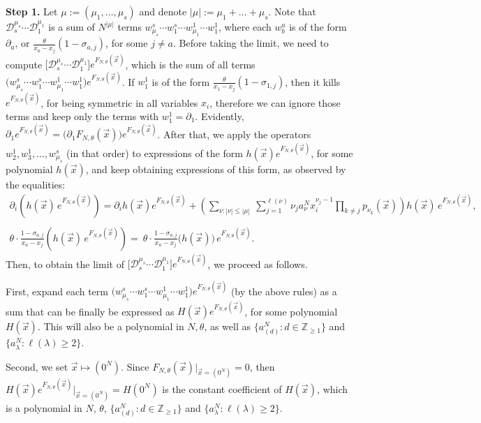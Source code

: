 \documentclass[11pt]{article}
\theoremstyle{plain}
\newcommand{\D}{\mathcal D}
\newcommand{\Z}{\mathbb Z}
\newcommand{\la}{\lambda}
\newcommand{\vecx}{\vec{x}}
\begin{document}
\medskip

\textbf{Step 1.} Let $\mu:=(\mu_1,\dots,\mu_s)$ and denote $|\mu|:=\mu_1+\dots+\mu_s$.
Note that $\D_s^{\mu_s}\cdots\D_1^{\mu_1}$ is a sum of $N^{|\mu|}$ terms $w^s_{\mu_s}\cdots w^s_1\cdots w^1_{\mu_1}\cdots w^1_1$, where each $w^a_b$ is of the form $\partial_a$, or $\frac{\theta}{x_a-x_j}(1-\sigma_{a,j})$, for some $j\ne a$.
Before taking the limit, we need to compute $\Big[ \D_s^{\mu_s}\cdots\D_1^{\mu_1} \Big] e^{ F_{N,\theta}(\vecx) }$, which is the sum of all terms $\big(w^s_{\mu_s}\cdots w^s_1\cdots w^1_{\mu_1}\cdots w^1_1\big)e^{F_{N,\theta}(\vecx)}$.
If $w^1_1$ is of the form $\frac{\theta}{x_1-x_j}(1-\sigma_{1,j})$, then it kills $e^{ F_{N,\theta}(\vecx) }$, for being symmetric in all variables $x_i$, therefore we can ignore those terms and keep only the terms with $w^1_1=\partial_1$.
Evidently, $\partial_1e^{ F_{N,\theta}(\vecx) } = \big( \partial_1 F_{N,\theta}(\vecx) \big) e^{ F_{N,\theta}(\vecx) }$.
After that, we apply the operators $w^1_2,w^1_3,\dots,w^s_{\mu_s}$ (in that order) to expressions of the form $h(\vecx)e^{F_{N,\theta}(\vecx)}$, for some polynomial $h(\vecx)$, and keep obtaining expressions of this form, as observed by the equalities:
\begin{gather}
\partial_i\left( h(\vecx)\, e^{F_{N,\theta}(\vecx)} \right) = \partial_i h(\vecx) e^{F_{N,\theta}(\vecx)} + \left(\sum_{\nu\colon|\nu|\le|\mu|}\ \sum_{j=1}^{\ell(\nu)}{ \nu_j a_\nu^N x_i^{\nu_j-1}\prod_{k\ne j}{p_{\nu_k}(\vecx)}} \right) h(\vecx)\,e^{F_{N,\theta}(\vecx)},\label{eq:partial_i}\\
\nonumber\\
\theta\cdot\frac{1-\sigma_{a,j}}{x_a-x_j}\left( h(\vecx)\,e^{F_{N,\theta}(\vecx)} \right) = \ \theta\cdot\frac{1-\sigma_{a,j}}{x_a-x_j}\big( h(\vecx) \big)\,e^{F_{N,\theta}(\vecx)}.\nonumber
\end{gather}
Then, to obtain the limit of $\Big[ \D_s^{\mu_s}\cdots\D_1^{\mu_1} \Big] e^{ F_{N,\theta}(\vecx) }$, we proceed as follows.

First, expand each term $\big(w^s_{\mu_s}\cdots w^s_1\cdots w^1_{\mu_1}\cdots w^1_1\big)e^{F_{N,\theta}(\vecx)}$ (by the above rules) as a sum that can be finally be expressed as $H(\vecx)e^{F_{N,\theta}(\vecx)}$, for some polynomial $H(\vecx)$. 
This will also be a polynomial in $N,\theta$, as well as $\{a_{(d)}^N : d\in\Z_{\ge 1}\}$ and $\{a_\la^N : \ell(\la)\ge 2\}$.

Second, we set $\vecx\mapsto(0^N)$. Since $F_{N,\theta}(\vecx)\big|_{\vecx=(0^N)}=0$, then $H(\vecx)e^{F_{N,\theta}(\vecx)}\big|_{\vecx=(0^N)}=H(0^N)$ is the constant coefficient of $H(\vecx)$, which is a polynomial in $N$, $\theta$, $\{a_{(d)}^N : d\in\Z_{\ge 1}\}$ and $\{a_\la^N : \ell(\la)\ge 2\}$.
\end{document}
